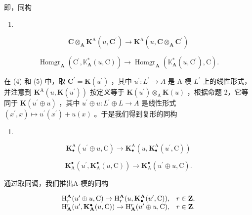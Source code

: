 即，同构

\begin{enumerate}
\def\labelenumi{(\arabic{enumi})}
\setcounter{enumi}{3}
\tightlist
\item
\end{enumerate}

\[
\mathbf {C} \otimes_ {\mathbf {A}} \mathbf {K} ^ {\mathrm{A}} (u, \mathbf {C} ^ {\prime}) \rightarrow \mathbf {K} ^ {\mathrm{A}} (u, \mathbf {C} \otimes_ {\mathbf {A}} \mathbf {C} ^ {\prime})\tag{5}
\]

\[
\operatorname{Homgr} _ {\mathbf {A}} \left(\mathrm{C} ^ {\prime}, \mathbb {K} _ {\mathbf {A}} ^ {*} (u, \mathrm{C})\right)\rightarrow \operatorname{Homgr} _ {\mathbf {A}} \left(\mathbb {K} _ {\mathbf {A}} ^ {*} (u, \mathrm{C} ^ {\prime}), \mathrm{C}\right).
\]

在 (4) 和 (5) 中，取 \(\mathbf{C}^{\prime} = \mathbf{K}(u^{\prime})\) ，其中 \(u^{\prime}: L^{\prime} \to A\) 是 A-模 \(L^{\prime}\) 上的线性形式，并注意到 \(\mathbf{K}^{\mathrm{A}}(u, \mathbf{K}(u^{\prime}))\) 按定义等于 \(\mathbf{K}(u^{\prime}) \otimes_{\mathrm{A}} \mathbf{K}(u)\) ，根据命题 2，它等同于 \(\mathbf{K}(u^{\prime} \oplus u)\) ，其中 \(u^{\prime} \oplus u: L^{\prime} \oplus L \to A\) 是线性形式 \((x^{\prime}, x) \mapsto u^{\prime}(x^{\prime}) + u(x)\) 。于是我们得到复形的同构

\begin{enumerate}
\def\labelenumi{(\arabic{enumi})}
\setcounter{enumi}{5}
\tightlist
\item
\end{enumerate}

\[
\mathbf {K} _ {\bullet} ^ {\mathrm{A}} (u ^ {\prime} \oplus u, \mathrm{C}) \rightarrow \mathbf {K} _ {\bullet} ^ {\mathrm{A}} (u, \mathbf {K} _ {\bullet} ^ {\mathrm{A}} (u ^ {\prime}, \mathrm{C}))\tag{7}
\]

\[
\mathbf {K} _ {\mathrm{A}} ^ {\bullet} (u ^ {\prime}, \mathbf {K} _ {\mathrm{A}} ^ {\bullet} (u, \mathrm{C})) \rightarrow \mathbf {K} _ {\mathrm{A}} ^ {\bullet} (u ^ {\prime} \oplus u, \mathrm{C}).
\]

通过取同调，我们推出A-模的同构

\[
\begin{array}{c c} \mathrm{H} _ {r} ^ {\mathbf {A}} (u ^ {\prime} \oplus u, \mathrm{C}) \to \mathrm{H} _ {r} ^ {\mathbf {A}} (u, \mathbf {K} _ {\bullet} ^ {\mathbf {A}} (u ^ {\prime}, \mathrm{C}))  , & r \in \mathbf {Z}  , \\ \mathrm{H} _ {\mathbf {A}} ^ {r} (u ^ {\prime}, \mathbf {K} _ {\mathbf {A}} ^ {\bullet} (u, \mathrm{C})) \to \mathrm{H} _ {\mathbf {A}} ^ {r} (u ^ {\prime} \oplus u, \mathrm{C})  , & r \in \mathbf {Z}  . \end{array}
\]

